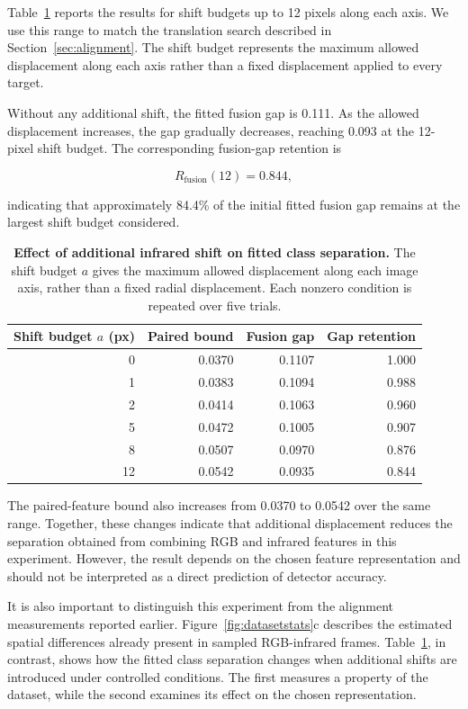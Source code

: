 \documentclass[10pt]{article}
\begin{document}
Table~\ref{tab:alignstressmain} reports the results for shift budgets up to 12 pixels along each axis. We use this range to match the translation search described in Section~\ref{sec:alignment}. The shift budget represents the maximum allowed displacement along each axis rather than a fixed displacement applied to every target.

Without any additional shift, the fitted fusion gap is 0.111. As the allowed displacement increases, the gap gradually decreases, reaching 0.093 at the 12-pixel shift budget. The corresponding fusion-gap retention is

\begin{equation}
R_{\mathrm{fusion}}(12)=0.844,
\end{equation}

indicating that approximately 84.4\% of the initial fitted fusion gap remains at the largest shift budget considered.

\begin{table}[t]
\centering
\caption{\textbf{Effect of additional infrared shift on fitted class separation.}
The shift budget $a$ gives the maximum allowed displacement along each image axis, rather than a fixed radial displacement. Each nonzero condition is repeated over five trials.}
\label{tab:alignstressmain}
\small
\begin{tabular}{rrrr}
\toprule
Shift budget $a$ (px) & Paired bound & Fusion gap & Gap retention \\
\midrule
0  & 0.0370 & 0.1107 & 1.000 \\
1  & 0.0383 & 0.1094 & 0.988 \\
2  & 0.0414 & 0.1063 & 0.960 \\
5  & 0.0472 & 0.1005 & 0.907 \\
8  & 0.0507 & 0.0970 & 0.876 \\
12 & 0.0542 & 0.0935 & 0.844 \\
\bottomrule
\end{tabular}
\end{table}

The paired-feature bound also increases from 0.0370 to 0.0542 over the same range. Together, these changes indicate that additional displacement reduces the separation obtained from combining RGB and infrared features in this experiment. However, the result depends on the chosen feature representation and should not be interpreted as a direct prediction of detector accuracy.

It is also important to distinguish this experiment from the alignment measurements reported earlier. Figure~\ref{fig:datasetstats}c describes the estimated spatial differences already present in sampled RGB-infrared frames. Table~\ref{tab:alignstressmain}, in contrast, shows how the fitted class separation changes when additional shifts are introduced under controlled conditions. The first measures a property of the dataset, while the second examines its effect on the chosen representation.
\end{document}
